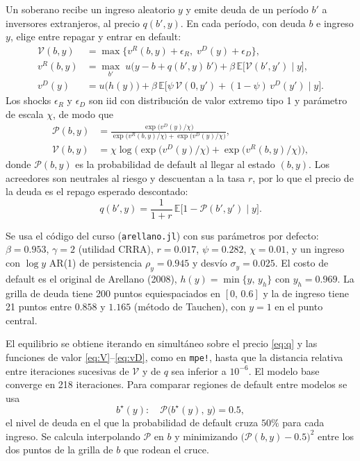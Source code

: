 \documentclass[11pt,a4paper]{article}
\begin{document}
Un soberano recibe un ingreso aleatorio $y$ y emite deuda de un período $b'$ a inversores extranjeros, al precio $q(b',y)$. En cada período, con deuda $b$ e ingreso $y$, elige entre repagar y entrar en default:
\begin{align}
\mathcal{V}(b,y) &= \max\big\{v^R(b,y)+\epsilon_R,\; v^D(y)+\epsilon_D\big\}, \label{eq:V}\\
v^R(b,y) &= \max_{b'}\; u\big(y-b+q(b',y)\,b'\big)+\beta\,\mathbb{E}\big[\mathcal{V}(b',y')\mid y\big], \label{eq:vR}\\
v^D(y) &= u\big(h(y)\big)+\beta\,\mathbb{E}\big[\psi\,\mathcal{V}(0,y')+(1-\psi)\,v^D(y')\mid y\big]. \label{eq:vD}
\end{align}
Los shocks $\epsilon_R$ y $\epsilon_D$ son iid con distribución de valor extremo tipo 1 y parámetro de escala $\chi$, de modo que
\begin{align}
\mathcal{P}(b,y)&=\frac{\exp\big(v^D(y)/\chi\big)}{\exp\big(v^R(b,y)/\chi\big)+\exp\big(v^D(y)/\chi\big)}, \label{eq:P}\\
\mathcal{V}(b,y)&=\chi\log\Big(\exp\big(v^D(y)/\chi\big)+\exp\big(v^R(b,y)/\chi\big)\Big), \label{eq:logsum}
\end{align}
donde $\mathcal{P}(b,y)$ es la probabilidad de default al llegar al estado $(b,y)$. Los acreedores son neutrales al riesgo y descuentan a la tasa $r$, por lo que el precio de la deuda es el repago esperado descontado:
\begin{equation}\label{eq:q}
q(b',y)=\frac{1}{1+r}\,\mathbb{E}\big[1-\mathcal{P}(b',y')\mid y\big].
\end{equation}

Se usa el código del curso (\texttt{arellano.jl}) con sus parámetros por defecto: $\beta=0.953$, $\gamma=2$ (utilidad CRRA), $r=0.017$, $\psi=0.282$, $\chi=0.01$, y un ingreso con $\log y$ AR(1) de persistencia $\rho_y=0.945$ y desvío $\sigma_y=0.025$. El costo de default es el original de Arellano (2008), $h(y)=\min\{y,\,y_h\}$ con $y_h=0.969$. La grilla de deuda tiene 200 puntos equiespaciados en $[0,\,0.6]$ y la de ingreso tiene 21 puntos entre $0.858$ y $1.165$ (método de Tauchen), con $y=1$ en el punto central.

El equilibrio se obtiene iterando en simultáneo sobre el precio \eqref{eq:q} y las funciones de valor \eqref{eq:V}--\eqref{eq:vD}, como en \texttt{mpe!}, hasta que la distancia relativa entre iteraciones sucesivas de $\mathcal{V}$ y de $q$ sea inferior a $10^{-6}$. El modelo base converge en 218 iteraciones. Para comparar regiones de default entre modelos se usa
\begin{equation}\label{eq:bstar}
b^\star(y):\quad \mathcal{P}\big(b^\star(y),\,y\big)=0.5,
\end{equation}
el nivel de deuda en el que la probabilidad de default cruza $50\%$ para cada ingreso. Se calcula interpolando $\mathcal{P}$ en $b$ y minimizando $\big(\mathcal{P}(b,y)-0.5\big)^2$ entre los dos puntos de la grilla de $b$ que rodean el cruce.
\end{document}
